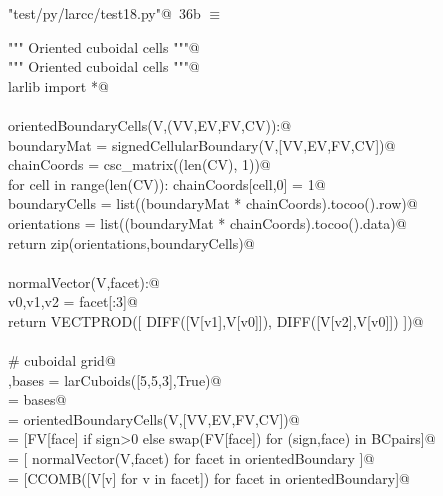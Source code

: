 \documentclass[11pt,oneside]{article}	%
\begin{document}
\begin{flushleft} \small \label{scrap58}
\protect{}\verb@"test/py/larcc/test18.py"@\nobreak\ {\footnotesize 36b }$\equiv$
\vspace{-1ex}
\begin{list}{}{} \item
\mbox{}\verb@""" Oriented cuboidal cells """@\\
\mbox{}\verb@""" Oriented cuboidal cells """@\\
\mbox{}\verb@from larlib import *@\\
\mbox{}\verb@@\\
\mbox{}\verb@def orientedBoundaryCells(V,(VV,EV,FV,CV)):@\\
\mbox{}\verb@    boundaryMat = signedCellularBoundary(V,[VV,EV,FV,CV])@\\
\mbox{}\verb@    chainCoords = csc_matrix((len(CV), 1))@\\
\mbox{}\verb@    for cell in range(len(CV)): chainCoords[cell,0] = 1@\\
\mbox{}\verb@    boundaryCells = list((boundaryMat * chainCoords).tocoo().row)@\\
\mbox{}\verb@    orientations = list((boundaryMat * chainCoords).tocoo().data)@\\
\mbox{}\verb@    return zip(orientations,boundaryCells)@\\
\mbox{}\verb@@\\
\mbox{}\verb@def normalVector(V,facet):@\\
\mbox{}\verb@    v0,v1,v2 = facet[:3]@\\
\mbox{}\verb@    return VECTPROD([ DIFF([V[v1],V[v0]]), DIFF([V[v2],V[v0]]) ])@\\
\mbox{}\verb@@\\
\mbox{}\verb@# cuboidal grid@\\
\mbox{}\verb@V,bases = larCuboids([5,5,3],True)@\\
\mbox{}\verb@[VV,EV,FV,CV] = bases@\\
\mbox{}\verb@BCpairs = orientedBoundaryCells(V,[VV,EV,FV,CV])@\\
\mbox{}\verb@orientedBoundary = [FV[face] if sign>0 else swap(FV[face]) for (sign,face) in BCpairs]@\\
\mbox{}\verb@normals = [ normalVector(V,facet)  for facet in orientedBoundary ]@\\
\mbox{}\verb@facetCentroids = [CCOMB([V[v] for v in facet]) for facet in orientedBoundary]@\\

\end{list}
\end{flushleft}
\end{document}
